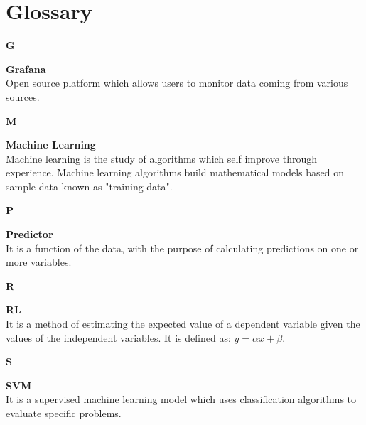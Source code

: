 \section{Glossary}

{\Large\textbf{G}\par}
\textbf{Grafana} \\
Open source platform which allows users to monitor data coming from various sources.

{\Large\textbf{M}\par}
\textbf{Machine Learning} \\
Machine learning is the study of algorithms which self improve through experience. Machine learning algorithms build mathematical models based on sample data known as "training data". 

{\Large\textbf{P}\par}
\textbf{Predictor} \\
It is a function of the data, with the purpose of calculating predictions on one or more variables.

{\Large\textbf{R}\par}
\textbf{RL} \\
It is a method of estimating the expected value of a dependent variable given the values of the independent variables. 
It is defined as: $y = \alpha x + \beta $.

{\Large\textbf{S}\par}
\textbf{SVM} \\
It is a supervised machine learning model which uses classification algorithms to evaluate specific problems.